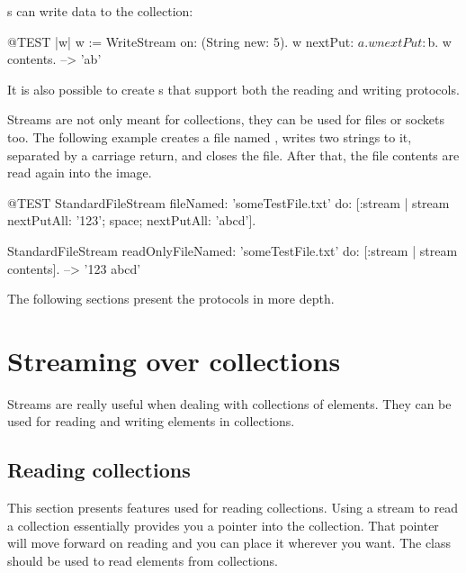 \documentclass[a4paper,10pt,twoside]{book}
\begin{document}
s can write data to the collection:
\begin{code}{@TEST |w|}
w := WriteStream on: (String new: 5).
w nextPut: $a.
w nextPut: $b.
w contents. -->  'ab'
\end{code}

It is also possible to create s that support both the reading and writing protocols.

Streams are not only meant for collections, they can be used for files or sockets too.
The following example creates a file named , writes two strings to it, separated by a carriage return, and closes the file.
After that, the file contents are read again into the image.

\begin{code}{@TEST}
StandardFileStream
  fileNamed: 'someTestFile.txt'
  do: [:stream | stream
        nextPutAll: '123';
        space;
        nextPutAll: 'abcd'].

StandardFileStream readOnlyFileNamed: 'someTestFile.txt' do: [:stream | stream contents]. --> '123 abcd'
\end{code}

The following sections present the protocols in more depth.

\section{Streaming over collections}

Streams are really useful when dealing with collections of elements.
They can be used for reading and writing elements in collections.

\subsection{Reading collections}

This section presents features used for reading collections.
Using a stream to read a collection essentially provides you a pointer into the collection.
That pointer will move forward on reading and you can place it wherever you want.
The class  should be used to read elements from collections.
\end{document}
